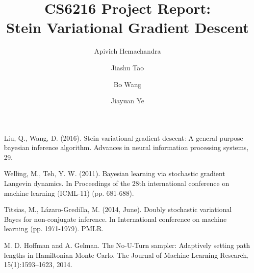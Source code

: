 \documentclass[runningheads]{llncs}
\begin{document}
%
\title{CS6216 Project Report: \\Stein Variational Gradient Descent}
%
%
\author{Apivich Hemachandra \and
Jiashu Tao \and
Bo Wang   \and
Jiayuan Ye }
%
%


\maketitle              %
%







%
%
%
% 
% 
%
\begin{thebibliography}{8}
Liu, Q., Wang, D. (2016). Stein variational gradient descent: A general purpose bayesian inference algorithm. Advances in neural information processing systems, 29.

Welling, M., Teh, Y. W. (2011). Bayesian learning via stochastic gradient Langevin dynamics. In Proceedings of the 28th international conference on machine learning (ICML-11) (pp. 681-688).

Titsias, M., Lázaro-Gredilla, M. (2014, June). Doubly stochastic variational Bayes for non-conjugate inference. In International conference on machine learning (pp. 1971-1979). PMLR.

M. D. Hoffman and A. Gelman. The No-U-Turn sampler: Adaptively setting path lengths in Hamiltonian Monte Carlo. The Journal of Machine Learning Research, 15(1):1593–1623, 2014.
\end{thebibliography}

\appendix


\end{document}
